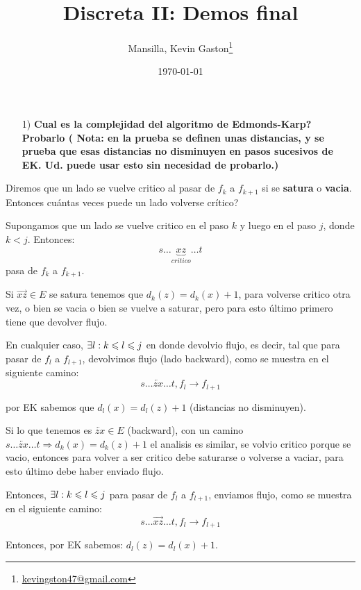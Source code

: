 \documentclass[12pt,a4paper]{article}
\author{Mansilla, Kevin Gaston\footnote{\href{mailto:kevingston47@gmail.com}{kevingston47@gmail.com}}}
\title{Discreta II: Demos final}
\date{\today}
\begin{document}
\maketitle{}

\begin{itemize}
    \item [1)] \textbf{Cual es la complejidad del algoritmo de Edmonds-Karp? Probarlo (
        Nota: en la prueba se definen unas distancias, y se prueba que esas 
        distancias no disminuyen en pasos sucesivos de EK. Ud. puede usar esto 
        sin necesidad de probarlo.)}
        \label{dem:EK}
\end{itemize}

Diremos que un lado se vuelve critico al pasar de $f_{k}$ a $f_{k+1}$ si 
se \textbf{satura} o \textbf{vacia}. Entonces cuántas veces puede un lado volverse 
crítico?
\medskip

Supongamos que un lado se vuelve critico en el paso $k$ y luego en el paso $j$, 
donde $k < j$. Entonces:
$$s \ldots \underbrace{xz}_{critico}\ldots t$$
pasa de $f_{k}$ a $f_{k+1}$.
\medskip

Si $\overrightarrow{xz} \in E$ se satura tenemos que $d_{k}(z) = d_{k}(x)+1$, para 
volverse critico otra vez, o bien se vacia o bien se vuelve a saturar, pero para 
esto último primero tiene que devolver flujo.
\medskip

En cualquier caso, $\exists l: k \leqslant l \leqslant j$ en donde devolvio flujo, es decir, tal 
que para pasar de $f_{l}$ a $f_{l+1}$, devolvimos flujo (lado backward), como se 
muestra en el siguiente camino:
$$s \ldots \overleftarrow{zx} \ldots t, f_{l} \to f_{l+1}$$

por EK sabemos que $d_{l}(x) = d_{l}(z) + 1$ (distancias no disminuyen).
\medskip

Si lo que tenemos es $\overleftarrow{zx} \in E$ (backward), con un camino 
$s \ldots \overleftarrow{zx} \ldots t \Rightarrow d_{k}(x) = d_{k}(z) +1$ el 
analisis es similar, se volvio critico porque se vacio, entonces para volver a 
ser critico debe saturarse o volverse a vaciar, para esto último debe haber 
enviado flujo.
\medskip

Entonces, $\exists l: k \leqslant l \leqslant j$ para pasar de $f_{l}$ a $f_{l+1}$, enviamos 
flujo, como se muestra en el siguiente camino:
$$s\ldots \overrightarrow{xz} \ldots t, f_{l} \to f_{l+1}$$

Entonces, por EK sabemos: $d_{l}(z) = d_{l}(x) + 1$.
\medskip
\end{document}
